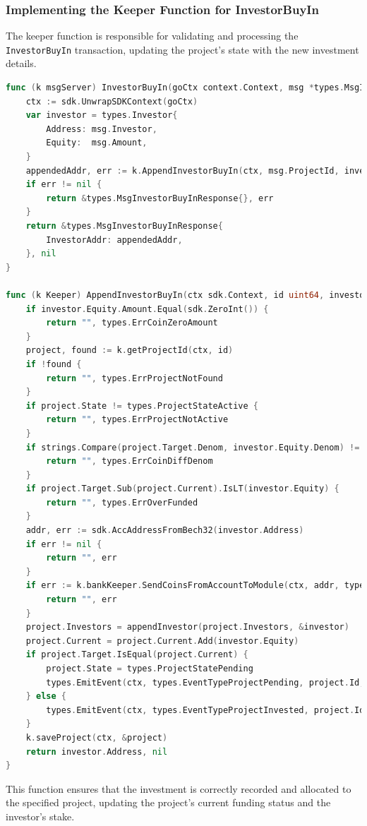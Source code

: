\subsubsection{Implementing the Keeper Function for InvestorBuyIn}

The keeper function is responsible for validating and processing the \texttt{InvestorBuyIn} transaction, updating the project's state with the new investment details.

\begin{lstlisting}[language=go, caption=Keeper implementation for Investor Buy-in, label={lst:keeper_investor_buyin}]
func (k msgServer) InvestorBuyIn(goCtx context.Context, msg *types.MsgInvestorBuyIn) (*types.MsgInvestorBuyInResponse, error) {
	ctx := sdk.UnwrapSDKContext(goCtx)
	var investor = types.Investor{
		Address: msg.Investor,
		Equity:  msg.Amount,
	}
	appendedAddr, err := k.AppendInvestorBuyIn(ctx, msg.ProjectId, investor)
	if err != nil {
		return &types.MsgInvestorBuyInResponse{}, err
	}
	return &types.MsgInvestorBuyInResponse{
		InvestorAddr: appendedAddr,
	}, nil
}

func (k Keeper) AppendInvestorBuyIn(ctx sdk.Context, id uint64, investor types.Investor) (string, error) {
	if investor.Equity.Amount.Equal(sdk.ZeroInt()) {
		return "", types.ErrCoinZeroAmount
	}
	project, found := k.getProjectId(ctx, id)
	if !found {
		return "", types.ErrProjectNotFound
	}
	if project.State != types.ProjectStateActive {
		return "", types.ErrProjectNotActive
	}
	if strings.Compare(project.Target.Denom, investor.Equity.Denom) != 0 {
		return "", types.ErrCoinDiffDenom
	}
	if project.Target.Sub(project.Current).IsLT(investor.Equity) {
		return "", types.ErrOverFunded
	}
	addr, err := sdk.AccAddressFromBech32(investor.Address)
	if err != nil {
		return "", err
	}
	if err := k.bankKeeper.SendCoinsFromAccountToModule(ctx, addr, types.ModuleName, sdk.NewCoins(investor.Equity)); err != nil {
		return "", err
	}
	project.Investors = appendInvestor(project.Investors, &investor)
	project.Current = project.Current.Add(investor.Equity)
	if project.Target.IsEqual(project.Current) {
		project.State = types.ProjectStatePending
		types.EmitEvent(ctx, types.EventTypeProjectPending, project.Id, investor.Address)
	} else {
		types.EmitEvent(ctx, types.EventTypeProjectInvested, project.Id, investor.Address)
	}
	k.saveProject(ctx, &project)
	return investor.Address, nil
}
\end{lstlisting}

This function ensures that the investment is correctly recorded and allocated to the specified project, updating the project's current funding status and the investor's stake.


